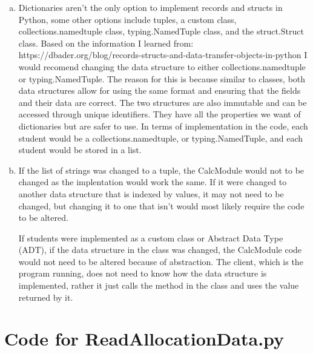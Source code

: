 \documentclass[12pt]{article}
\begin{document}
\begin{enumerate}[(a)]
\item Dictionaries aren't the only option to implement records and structs in Python,
some other options include tuples, a custom class, collections.namedtuple class, 
typing.NamedTuple class, and the struct.Struct class. Based on the information I learned
from: https://dbader.org/blog/records-structs-and-data-transfer-objects-in-python
I would recomend changing the data structure to either collections.namedtuple or
typing.NamedTuple. The reason for this is because similar to classes, both data
structures allow for using the same format and ensuring that the fields and their 
data are correct. The two structures are also immutable and can be accessed through
unique identifiers. They have all the properties we want of dictionaries but are
safer to use. In terms of implementation in the code, each student would be a
collections.namedtuple, or typing.NamedTuple, and each student would be stored 
in a list.

\item If the list of strings was changed to a tuple, the CalcModule would not to be
changed as the implentation would work the same. If it were changed to another data structure
that is indexed by values, it may not need to be changed, but changing it to one that isn't
would most likely require the code to be altered.

If students were implemented as a custom class or Abstract Data Type (ADT), if the data
structure in the class was changed, the CalcModule code would not need to be altered
because of abstraction. The client, which is the program running, does not need to know
how the data structure is implemented, rather it just calls the method in the class and
uses the value returned by it.

\end{enumerate}

\newpage

\lstset{language=Python, basicstyle=\tiny, breaklines=true, showspaces=false,
  showstringspaces=false, breakatwhitespace=true}

\def\thesection{\Alph{section}}

\section{Code for ReadAllocationData.py}

\noindent 
\end{document}
